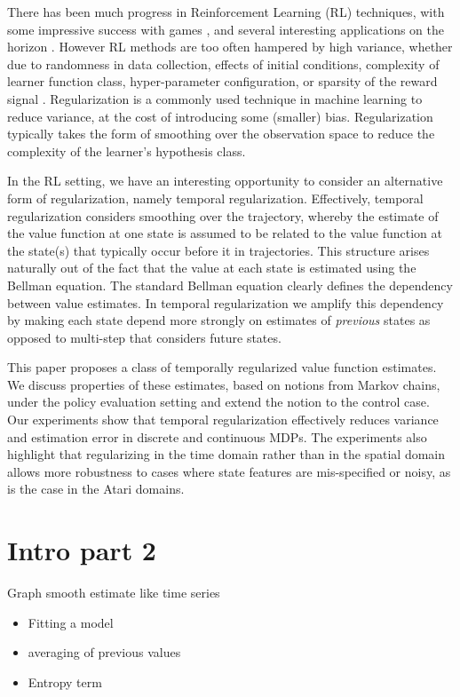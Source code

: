 There has been much progress in Reinforcement Learning (RL) techniques, with some impressive success with games \cite{silver16}, and several interesting applications on the horizon \cite{koedinger18,shortreed11,prasad17,dhingra17}. However RL methods are too often hampered by high variance, whether due to randomness in data collection, effects of initial conditions, complexity of learner function class, hyper-parameter configuration, or sparsity of the reward signal \cite{henderson2017deep}.
Regularization is a commonly used technique in machine learning to reduce variance, at the cost of introducing some (smaller) bias.  Regularization typically takes the form of smoothing over the observation space to reduce the complexity of the learner's hypothesis class.

In the RL setting, we have an interesting opportunity to consider an alternative form of regularization, namely temporal regularization.  Effectively, temporal regularization considers smoothing over the trajectory, whereby the estimate of the value function at one state is assumed to be related to the value function at the state(s) that typically occur before it in trajectories. This structure arises naturally out of the fact that the value at each state is estimated using the Bellman equation. The standard Bellman equation clearly defines the dependency between value estimates. In temporal regularization we amplify this dependency by making each state depend more strongly on estimates of \emph{previous} states as opposed to multi-step that considers future states. 

This paper proposes a class of temporally regularized value function estimates. We discuss properties of these estimates, based on notions from Markov chains, under the policy evaluation setting and extend the notion to the control case.
Our experiments show that temporal regularization effectively reduces variance and estimation error in discrete and continuous MDPs.  The experiments also highlight that regularizing in the time domain rather than in the spatial domain allows more robustness to cases where state features are mis-specified or noisy, as is the case in the Atari domains.

\section{Intro part 2}
Graph smooth estimate like time series
\begin{itemize}
    \item Fitting a model
    \item averaging of previous values
    \item Entropy term 
\end{itemize}


